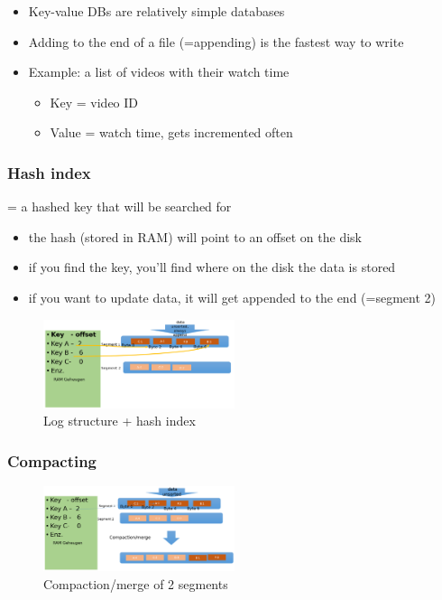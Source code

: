 \documentclass{article}
\begin{document}
\begin{itemize}
    \item Key-value DBs are relatively simple databases
    \item Adding to the end of a file (=appending) is the fastest way to write
    \item Example: a list of videos with their watch time
    \begin{itemize}
        \item Key =  video ID
        \item Value = watch time, gets incremented often
    \end{itemize}
\end{itemize}

\subsubsection{Hash index}

= a hashed key that will be searched for

\begin{itemize}
    \item the hash (stored in RAM) will point to an offset on the disk
    \item if you find the key, you'll find where on the disk the data is stored
    \item if you want to update data, it will get appended to the end (=segment 2)
\end{itemize}

\begin{figure}[H]
    \centering
    \includegraphics[width=0.5\textwidth]{key-value.png}
    \caption{Log structure + hash index}
\end{figure}

\subsubsection{Compacting}

\begin{figure}[H]
    \centering
    \includegraphics[width=0.5\textwidth]{key-value-compacting.png}
    \caption{Compaction/merge of 2 segments}
\end{figure}
\end{document}
